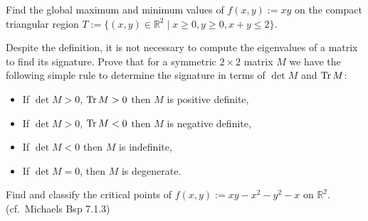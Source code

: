 
\begin{aiexercise}
\label{ex:ai_extrema_triangle}
Find the global maximum and minimum values of $f(x,y) := xy$ on the compact triangular region $T := \{(x,y) \in \mathbb{R}^2 \mid x \ge 0, y \ge 0, x+y \le 2\}$.
\end{aiexercise}




\begin{exercise}
\label{ex:signature_2x2_matrix}
Despite the definition, it is not necessary to compute the eigenvalues of a matrix to find its
signature. Prove that for a symmetric $2\times 2$ matrix $M$ we have the following simple rule to
determine the signature in terms of $\det M$ and $\operatorname{Tr} M$:
\begin{itemize}
  \item If $\det M > 0$, $\operatorname{Tr} M > 0$ then $M$ is positive definite,
  \item If $\det M > 0$, $\operatorname{Tr} M < 0$ then $M$ is negative definite,
  \item If $\det M < 0$ then $M$ is indefinite,
  \item If $\det M = 0$, then $M$ is degenerate.
\end{itemize}
\end{exercise}

\begin{exercise}
\label{ex:classifying_critical_points_xy}
Find and classify the critical points of $f(x,y) := xy - x^2 - y^2 - x$ on $\mathbb{R}^2$. (cf.\ Michaels Bsp 7.1.3)
\end{exercise}

